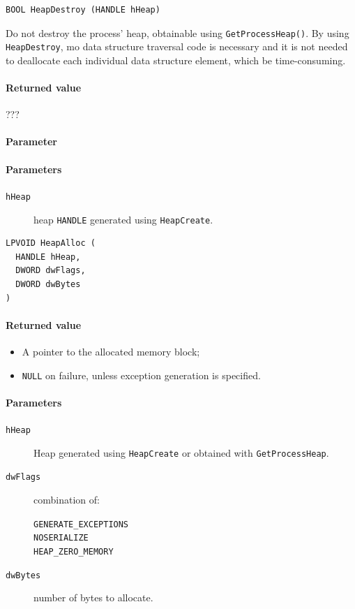 \begin{verbatim}
BOOL HeapDestroy (HANDLE hHeap)
\end{verbatim}
Do not destroy the process' heap, obtainable using \texttt{GetProcessHeap()}. By using \texttt{HeapDestroy}, mo data structure traversal code is necessary and it is not needed to deallocate each individual data structure element, which be time-consuming.

\paragraph{Returned value}
???

\paragraph{Parameter}
\paragraph{Parameters}
\begin{description}
\item [\texttt{hHeap}] heap \texttt{HANDLE} generated using \texttt{HeapCreate}.
\end{description}

\begin{verbatim}
LPVOID HeapAlloc (
  HANDLE hHeap,
  DWORD dwFlags,
  DWORD dwBytes
)
\end{verbatim}

\paragraph{Returned value}
\begin{itemize}
\item A pointer to the allocated memory block;
\item \texttt{NULL} on failure, unless exception generation is specified.
\end{itemize}

\paragraph{Parameters}
\begin{description}
\item [\texttt{hHeap}] Heap generated using \texttt{HeapCreate} or obtained with \texttt{GetProcessHeap}.
\item [\texttt{dwFlags}] combination of:
\begin{description}
\item [\texttt{GENERATE\_EXCEPTIONS}]
\item [\texttt{NO\-SERIALIZE}]
\item [\texttt{HEAP\_ZERO\_MEMORY}]
\end{description}
\item [\texttt{dwBytes}] number of bytes to allocate.
\end{description}

